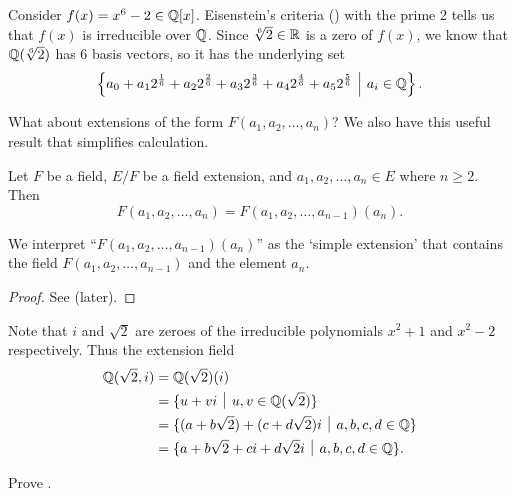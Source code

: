 \begin{example}
    Consider $f(x) = x^6 - 2 \in \mathbb{Q}[x]$. Eisenstein's criteria () with the prime 2 tells us that $f(x)$ is irreducible over $\mathbb{Q}$. Since $\sqrt[6]2 \in \mathbb{R}$ is a zero of $f(x)$, we know that $\mathbb{Q}(\sqrt[6]2)$ has 6 basis vectors, so it has the underlying set
    \[
        \left\{a_0 + a_12^{\frac16} + a_22^{\frac26} + a_32^{\frac36} + a_42^{\frac46} + a_52^{\frac56} \vert a_i \in \Q\right\}.
    \]
\end{example}

What about extensions of the form $F(a_1, a_2, \dots, a_n)$? We also have this useful result that simplifies calculation.
\begin{proposition}\label{prop-field-generated-by-S-inductive-definition}
    Let $F$ be a field, $E/F$ be a field extension, and $a_1, a_2, \dots, a_n \in E$ where $n \geq 2$. Then
    \[
        F(a_1, a_2, \dots, a_n) = F(a_1, a_2, \dots, a_{n-1})(a_n).
    \]
\end{proposition}
\begin{remark}
    We interpret ``$F(a_1, a_2, \dots, a_{n-1})(a_n)$'' as the `simple extension' that contains the field $F(a_1, a_2, \dots, a_{n-1})$ and the element $a_n$.
\end{remark}
\begin{proof}
    See  (later).
\end{proof}

\begin{example}
    Note that $i$ and $\sqrt 2$ are zeroes of the irreducible polynomials $x^2 + 1$ and $x^2 - 2$ respectively. Thus the extension field
    \begin{align*}
        \Q(\sqrt 2, i) &= \Q(\sqrt 2)(i)\\
        &= \{u + vi \vert u,v \in \Q(\sqrt2)\}\\
        &= \{(a+b\sqrt2) + (c+d\sqrt2)i \vert a, b, c, d \in \Q\}\\
        &= \{a + b\sqrt2 + ci + d\sqrt2i \vert a, b, c, d \in \Q\}.
    \end{align*}
\end{example}

\begin{exercise}\label{exercise-field-generated-by-S-inductive-definition}
    Prove .
\end{exercise}

\newpage

